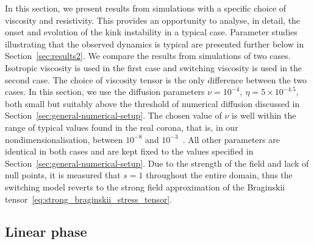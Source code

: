 In this section, we present results from simulations with a
specific choice of viscosity and resistivity. This provides an
opportunity to analyse, in detail, the onset and evolution of the kink
instability in a typical case. Parameter studies illustrating that
the observed dynamics is typical are presented further below
in Section~\ref{sec:results2}.
We compare the results from simulations of two
cases. Isotropic viscosity is used in the first case and switching
  viscosity is used in the second case. The choice of viscosity
tensor is the only difference between the two cases. In this
  section, we use the diffusion parameters $\nu = 10^{-4},\ \eta =
5\times 10^{-4.5}$, both small but suitably above the threshold of
numerical diffusion discussed in
Section~\ref{sec:general-numerical-setup}. The chosen value of $\nu$ is well within the range of typical values found in the real corona, that is, in our nondimensionalisation, between $10^{-8}$ and $10^{-3}$~\cite{rudermanSlowSurfaceWave2000}. All other parameters are
identical in both cases and are kept fixed to the values specified in
Section~\ref{sec:general-numerical-setup}. Due to the strength of the field and lack of null points, it is measured that $s=1$ throughout the entire domain, thus the switching model reverts to the strong field approximation of the Braginskii tensor~\eqref{eq:strong_braginskii_stress_tensor}.

\subsection{Linear phase}

